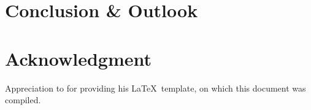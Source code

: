 %
\chapter{Conclusion \& Outlook}%











%
%
\chapter{Acknowledgment}%

%

Appreciation to  for providing his \LaTeX\ template, on which this document was compiled.

